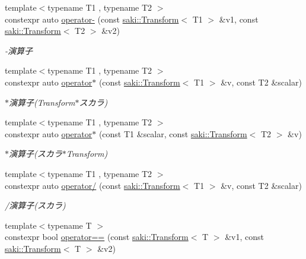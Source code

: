 \begin{DoxyCompactItemize}
{\footnotesize template$<$typename T1 , typename T2 $>$ }\\constexpr auto \mbox{\hyperlink{namespacesaki_a258f0124a288745a25dc806ba86fa356}{operator-\/}} (const \mbox{\hyperlink{classsaki_1_1_transform}{saki\+::\+Transform}}$<$ T1 $>$ \&v1, const \mbox{\hyperlink{classsaki_1_1_transform}{saki\+::\+Transform}}$<$ T2 $>$ \&v2)
\begin{DoxyCompactList}\small\item\em -\/演算子 \end{DoxyCompactList}\item 
{\footnotesize template$<$typename T1 , typename T2 $>$ }\\constexpr auto \mbox{\hyperlink{namespacesaki_a4ccd8e3dbc886bb65d452308a8de0409}{operator$\ast$}} (const \mbox{\hyperlink{classsaki_1_1_transform}{saki\+::\+Transform}}$<$ T1 $>$ \&v, const T2 \&scalar)
\begin{DoxyCompactList}\small\item\em $\ast$演算子(Transform$\ast$スカラ) \end{DoxyCompactList}\item 
{\footnotesize template$<$typename T1 , typename T2 $>$ }\\constexpr auto \mbox{\hyperlink{namespacesaki_a58e8c0c0b829ce6f2da4895bef1f0512}{operator$\ast$}} (const T1 \&scalar, const \mbox{\hyperlink{classsaki_1_1_transform}{saki\+::\+Transform}}$<$ T2 $>$ \&v)
\begin{DoxyCompactList}\small\item\em $\ast$演算子(スカラ$\ast$\+Transform) \end{DoxyCompactList}\item 
{\footnotesize template$<$typename T1 , typename T2 $>$ }\\constexpr auto \mbox{\hyperlink{namespacesaki_a317c4128723315d14a81d7643fa080aa}{operator/}} (const \mbox{\hyperlink{classsaki_1_1_transform}{saki\+::\+Transform}}$<$ T1 $>$ \&v, const T2 \&scalar)
\begin{DoxyCompactList}\small\item\em /演算子(スカラ) \end{DoxyCompactList}\item 
{\footnotesize template$<$typename T $>$ }\\constexpr bool \mbox{\hyperlink{namespacesaki_ac56eb811c4d74d9b697f061b08d9f0c6}{operator==}} (const \mbox{\hyperlink{classsaki_1_1_transform}{saki\+::\+Transform}}$<$ T $>$ \&v1, const \mbox{\hyperlink{classsaki_1_1_transform}{saki\+::\+Transform}}$<$ T $>$ \&v2)

\end{DoxyCompactItemize}
